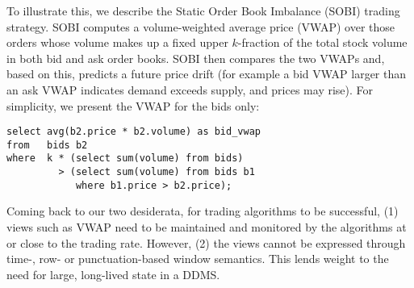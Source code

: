 To illustrate this, we describe the Static Order Book Imbalance (SOBI) trading
strategy. SOBI computes a volume-weighted average price (VWAP) over those orders
whose volume makes up a fixed upper $k$-fraction of the total stock volume in
both bid and ask order books. SOBI then compares the two VWAPs and, based on
this, predicts a future price drift (for example a bid VWAP larger than an ask
VWAP indicates demand exceeds supply, and prices may rise). For simplicity, we
present the VWAP for the bids only:



\begin{verbatim}
select avg(b2.price * b2.volume) as bid_vwap
from   bids b2
where  k * (select sum(volume) from bids)
         > (select sum(volume) from bids b1
            where b1.price > b2.price);
\end{verbatim}


Coming back to our two desiderata, for trading algorithms to be successful, (1) views
such as VWAP need to be maintained and monitored by the algorithms at or close to the
trading rate. However, (2) the views cannot be expressed through time-, row- or
punctuation-based window semantics.
This lends weight to the need for large, long-lived state in a DDMS.




